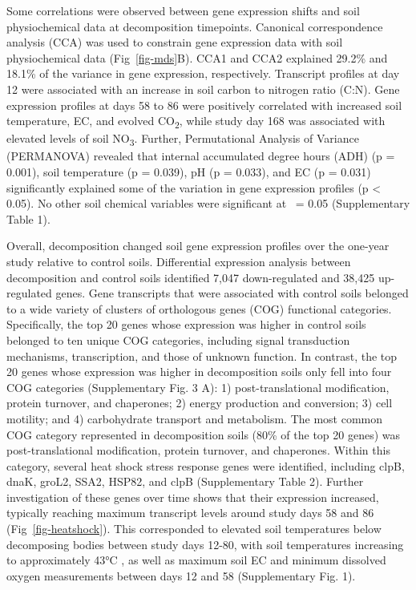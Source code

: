 \documentclass[
  sn-nature,
  lineno, referee]{sn-jnl}
\begin{document}
Some correlations were observed between gene expression shifts and soil
physiochemical data at decomposition timepoints. Canonical
correspondence analysis (CCA) was used to constrain gene expression data
with soil physiochemical data (Fig~\ref{fig-mds}B). CCA1 and CCA2
explained 29.2\% and 18.1\% of the variance in gene expression,
respectively. Transcript profiles at day 12 were associated with an
increase in soil carbon to nitrogen ratio (C:N). Gene expression
profiles at days 58 to 86 were positively correlated with increased soil
temperature, EC, and evolved CO\textsubscript{2}, while study day 168
was associated with elevated levels of soil NO\textsubscript{3}.
Further, Permutational Analysis of Variance (PERMANOVA) revealed that
internal accumulated degree hours (ADH) (p = 0.001), soil temperature (p
= 0.039), pH (p = 0.033), and EC (p = 0.031) significantly explained
some of the variation in gene expression profiles (p \textless{} 0.05).
No other soil chemical variables were significant at \textalpha~= 0.05
(Supplementary Table 1).

Overall, decomposition changed soil gene expression profiles over the
one-year study relative to control soils. Differential expression
analysis between decomposition and control soils identified 7,047
down-regulated and 38,425 up-regulated genes. Gene transcripts that were
associated with control soils belonged to a wide variety of clusters of
orthologous genes (COG) functional categories. Specifically, the top 20
genes whose expression was higher in control soils belonged to ten
unique COG categories, including signal transduction mechanisms,
transcription, and those of unknown function. In contrast, the top 20
genes whose expression was higher in decomposition soils only fell into
four COG categories (Supplementary Fig. 3 A): 1) post-translational
modification, protein turnover, and chaperones; 2) energy production and
conversion; 3) cell motility; and 4) carbohydrate transport and
metabolism. The most common COG category represented in decomposition
soils (80\% of the top 20 genes) was post-translational modification,
protein turnover, and chaperones. Within this category, several heat
shock stress response genes were identified, including clpB, dnaK,
groL2, SSA2, HSP82, and clpB (Supplementary Table 2). Further
investigation of these genes over time shows that their expression
increased, typically reaching maximum transcript levels around study
days 58 and 86 (Fig~\ref{fig-heatshock}). This corresponded to elevated
soil temperatures below decomposing bodies between study days 12-80,
with soil temperatures increasing to approximately 43°C
\citep{taylor_transient_2024}, as well as maximum soil EC and minimum
dissolved oxygen measurements between days 12 and 58 (Supplementary Fig.
1).
\end{document}
